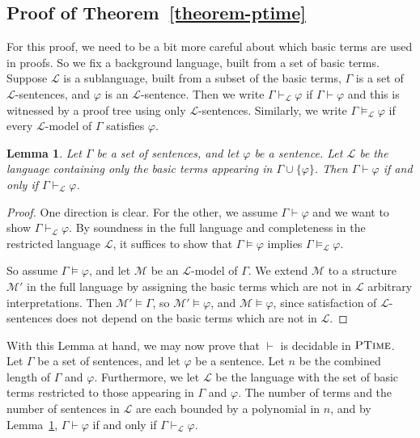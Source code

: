 \documentclass[letterpaper]{article} %
\newtheorem{lemma}[theorem]{Lemma}
\theoremstyle{definition}
\newcommand{\Model}{\mathcal{M}}
\newcommand{\Ptime}{\textsc{PTime}}
\begin{document}
\subsection*{Proof of Theorem~\ref{theorem-ptime}}

For this proof, we need to be a bit more careful about which basic terms are used in proofs. So we fix a background language, built from a set of basic terms. Suppose $\mathcal{L}$ is a sublanguage, built from a subset of the basic terms, $\Gamma$ is a set of $\mathcal{L}$-sentences, and $\varphi$ is an $\mathcal{L}$-sentence. Then we write $\Gamma\vdash_{\mathcal{L}} \varphi$ if $\Gamma\vdash \varphi$ and this is witnessed by a proof tree using only $\mathcal{L}$-sentences. Similarly, we write $\Gamma\models_{\mathcal{L}} \varphi$ if every $\mathcal{L}$-model of $\Gamma$ satisfies $\varphi$. 

\begin{lemma}\label{lemma-language}
Let $\Gamma$ be a set of sentences, and let $\varphi$ be a sentence. Let $\mathcal{L}$ be the language containing only the basic terms appearing in $\Gamma \cup \{\varphi\}$. Then $\Gamma\vdash \varphi$ if and only if $\Gamma\vdash_{\mathcal{L}} \varphi$. 
\end{lemma}

\begin{proof}
One direction is clear. For the other, we assume $\Gamma\vdash \varphi$ and we want to show $\Gamma\vdash_{\mathcal{L}}\varphi$. By soundness in the full language and completeness in the restricted language $\mathcal{L}$, it suffices to show that $\Gamma\models \varphi$ implies  $\Gamma\models_{\mathcal{L}} \varphi$.

So assume $\Gamma\models \varphi$, and let $\Model$ be an $\mathcal{L}$-model of $\Gamma$. We extend $\Model$ to a structure $\Model'$ in the full language by assigning the basic terms which are not in $\mathcal{L}$ arbitrary interpretations. Then $\Model'\models \Gamma$, so $\Model'\models \varphi$, and $\Model\models \varphi$, since satisfaction of $\mathcal{L}$-sentences does not depend on the basic terms which are not in $\mathcal{L}$.  
\end{proof}

With this Lemma at hand, we may now prove that $\vdash$ is decidable in $\Ptime$.
Let $\Gamma$ be a set of sentences, and let $\varphi$ be a sentence. Let $n$ be the combined length of $\Gamma$ and $\varphi$. Furthermore, we let $\mathcal{L}$ be the language with the set of basic terms restricted to those appearing in $\Gamma$ and $\varphi$. The number of terms and the number of sentences in $\mathcal{L}$ are each bounded by a polynomial in $n$, and by Lemma~\ref{lemma-language}, $\Gamma\vdash \varphi$ if and only if $\Gamma\vdash_{\mathcal{L}} \varphi$.
\end{document}
